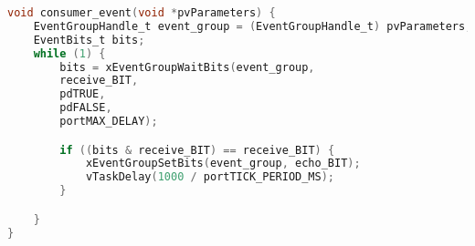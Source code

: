 \begin{lstlisting}[language=c,caption=Problem 4.3 Consumer 1 Task, label=list:p4_3_cons1]
void consumer_event(void *pvParameters) {
    EventGroupHandle_t event_group = (EventGroupHandle_t) pvParameters;
    EventBits_t bits;
    while (1) {
        bits = xEventGroupWaitBits(event_group,
        receive_BIT,
        pdTRUE,
        pdFALSE,
        portMAX_DELAY);

        if ((bits & receive_BIT) == receive_BIT) {
            xEventGroupSetBits(event_group, echo_BIT);
            vTaskDelay(1000 / portTICK_PERIOD_MS);
        }

    }
}
\end{lstlisting}

